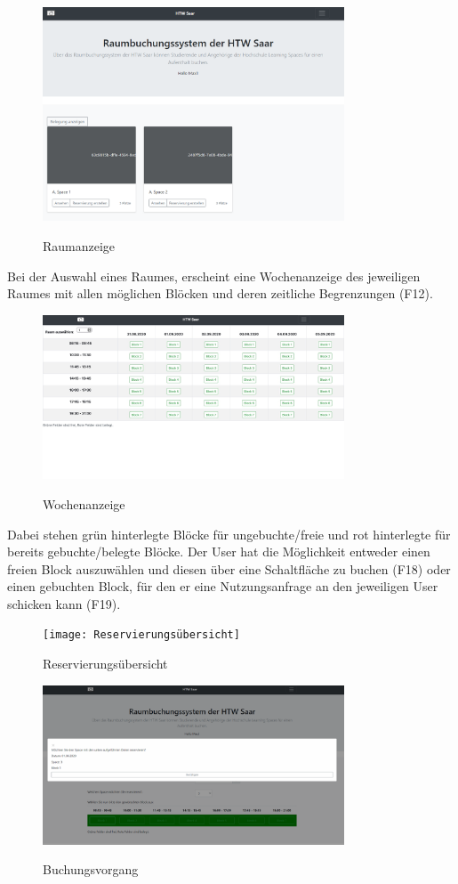 \documentclass[a4paper,report,headsepline]{scrreprt}
\begin{document}
\begin{figure}[h]
    \centering
    \caption{Raumanzeige}
    \includegraphics[width=0.8\textwidth]{Raumanzeige}
    \label{fig:Raumanzeige}
\end{figure}
Bei der Auswahl eines Raumes, erscheint eine Wochenanzeige des jeweiligen Raumes mit allen möglichen Blöcken und deren zeitliche Begrenzungen (F12).
\begin{figure}[h]
    \centering
    \caption{Wochenanzeige}
    \includegraphics[width=0.8\textwidth]{Wochenanzeige}
    \label{fig:Wochenanzeige}
\end{figure}
\clearpage
Dabei stehen grün hinterlegte Blöcke für ungebuchte/freie und rot hinterlegte für bereits gebuchte/belegte Blöcke. Der User hat die Möglichkeit entweder einen freien Block auszuwählen und diesen über eine Schaltfläche zu buchen (F18) oder einen gebuchten Block, für den er eine Nutzungsanfrage an den jeweiligen User schicken kann (F19).
\begin{figure}[h]
    \centering
    \caption{Reservierungsübersicht}
    \texttt{[image: Reservierungsübersicht]}
    \label{fig:Reservierungsübersicht}
\end{figure}
\begin{figure}[h]
    \centering
    \caption{Buchungsvorgang}
    \includegraphics[width=0.8\textwidth]{Buchungsvorgang}
    \label{fig:Buchungsvorgang}
\end{figure}
\end{document}
